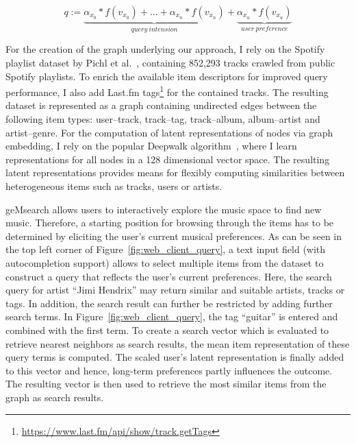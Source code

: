 \documentclass[sigconf]{acmart}
\begin{document}


\begin{equation}
\tag{1}
q := 
\underbrace{
	\alpha_{x_{0}} * f(v_{x_{0}}) + ... + \alpha_{x_{n}} * f(v_{x_{n}})
}_{query \: intension} +
\underbrace{
	\alpha_{x_{u}} * f(v_{x_{u}})
}_{user \: preference}
\label{eqn:Stokes}
\end{equation}




For the creation of the graph underlying our approach, I rely on the Spotify playlist dataset by Pichl et al.~\cite{pichl2017improving}, containing 852,293 tracks crawled from public Spotify playlists. To enrich the available item descriptors for improved query performance, I also add Last.fm tags\footnote{\url{https://www.last.fm/api/show/track.getTags}} for the contained tracks. The resulting dataset is represented as a graph containing undirected edges between the following item types: user--track, track--tag, track--album, album--artist and artist--genre. For the computation of latent representations of nodes via graph embedding, I rely on the popular Deepwalk algorithm~\cite{perozzi2014deepwalk}, where I learn representations for all nodes in a 128 dimensional vector space. The resulting latent representations provides means for flexibly computing similarities between heterogeneous items such as tracks, users or artists. %

geMsearch allows users to interactively explore the music space to find new music. Therefore, a starting position for browsing through the items has to be determined by eliciting the user's current musical preferences. As can be seen in the top left corner of Figure~\ref{fig:web_client_query}, a text input field (with autocompletion support) allows to select multiple items from the dataset to construct a query that reflects the user's current preferences. Here, the search query for artist ``Jimi Hendrix'' may return similar and suitable artists, tracks or tags. In addition, the search result can further be restricted by adding further search terms. In Figure~\ref{fig:web_client_query}, the tag ``guitar'' is entered and combined with the first term. To create a search vector which is evaluated to retrieve nearest neighbors as search results, the mean item representation of these query terms is computed. The scaled user's latent representation is finally added to this vector and hence, long-term preferences partly influences the outcome. The resulting vector is then used to retrieve the most similar items from the graph as search results.
\end{document}
